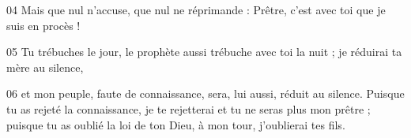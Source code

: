
04 Mais que nul n’accuse, que nul ne réprimande : Prêtre, c’est avec toi que je suis en procès !

05 Tu trébuches le jour, le prophète aussi trébuche avec toi la nuit ; je réduirai ta mère au silence,

06 et mon peuple, faute de connaissance, sera, lui aussi, réduit au silence. Puisque tu as rejeté la connaissance, je te rejetterai et tu ne seras plus mon prêtre ; puisque tu as oublié la loi de ton Dieu, à mon tour, j’oublierai tes fils.
